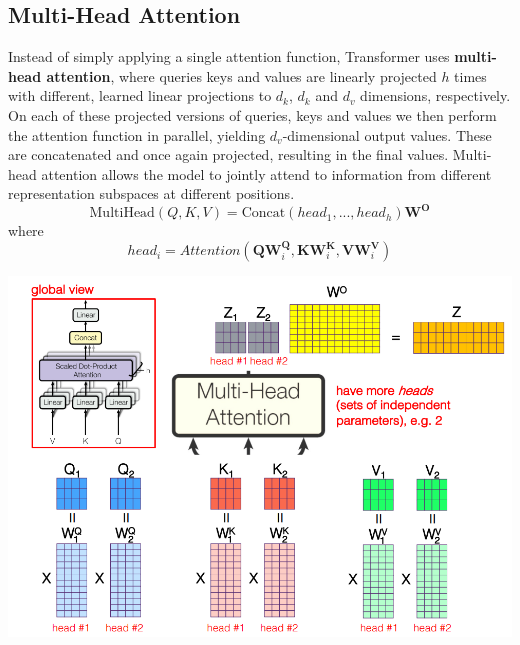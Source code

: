 \subsection{Multi-Head Attention}
Instead of simply applying a single attention function, Transformer uses \textbf{multi-head attention}, where queries keys and values are linearly projected $h$ times  with different, learned linear projections to $d_k$, $d_k$ and $d_v$ dimensions, respectively. On each of these projected versions of queries, keys and values we then perform the attention function in parallel, yielding $d_v$-dimensional output values. These are concatenated and once again projected, resulting in the final values.\newline\newline
Multi-head attention allows the model to jointly attend to information from different representation subspaces at different positions.
\[\text{MultiHead}(Q, K, V ) = \text{Concat}(head_1, ..., head_h)\textbf{W}^\textbf{O}\]
where
\[head_i = Attention(\textbf{Q}\textbf{W}_i^\textbf{Q}, \textbf{K}\textbf{W}_i^\textbf{K}, \textbf{V}\textbf{W}_i^\textbf{V})\]
\begin{center}
    \includegraphics[scale=0.6]{images/multi-head attention.png}
\end{center}

